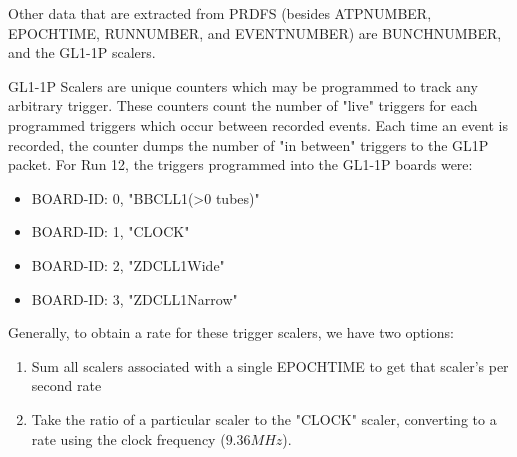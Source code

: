Other data that are extracted from PRDFS (besides ATPNUMBER, EPOCHTIME,
RUNNUMBER, and EVENTNUMBER) are BUNCHNUMBER, and the GL1-1P scalers.

GL1-1P Scalers are unique counters which may be programmed to track any
arbitrary trigger. These counters count the number of "live" triggers for each
programmed triggers which occur between recorded events. Each time an event is
recorded, the counter dumps the number of "in between" triggers to the GL1P
packet. For Run 12, the triggers programmed into the GL1-1P boards were:

\begin{itemize}
\item BOARD-ID: 0, "BBCLL1(\textgreater0 tubes)"
\item BOARD-ID: 1, "CLOCK"
\item BOARD-ID: 2, "ZDCLL1Wide"
\item BOARD-ID: 3, "ZDCLL1Narrow"
\end{itemize}

Generally, to obtain a rate for these trigger scalers, we have two options:
\begin{enumerate}
\item Sum all scalers associated with a single EPOCHTIME to get that scaler's per second
rate
\item Take the ratio of a particular scaler to the "CLOCK" scaler, converting to a rate
using the clock frequency ($9.36MHz$).
\end{enumerate}

